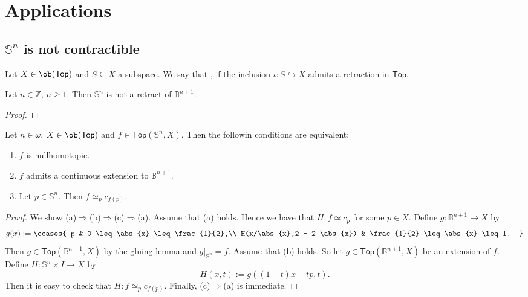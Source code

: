 \section*{Applications}
\subsection*{$\mathbb{S}^n$ is not contractible}

\begin{definition}[Retract]
	Let $X \in \ob(\mathsf{Top})$ and $S \subseteq X$ a subspace. We say that ,  if the inclusion $\iota : S \hookrightarrow X$ admits a retraction in $\mathsf{Top}$.
\end{definition}

\begin{lemma}
	Let $n \in \mathbb{Z}$, $n \geq 1$. Then $\mathbb{S}^n$ is not a retract of $\mathbb{B}^{n + 1}$. 	
\end{lemma}

\begin{proof}
	
\end{proof}

\begin{proposition}
	Let $n \in \omega$, $X \in \ob(\mathsf{Top})$ and $f \in \mathsf{Top}(\mathbb{S}^n,X)$. Then the followin conditions are equivalent:
	\begin{enumerate}[label = \textup{(}\alph*\textup{)},wide = 0pt]
		\item $f$ is nullhomotopic.
		\item $f$ admits a continuous extension to $\mathbb{B}^{n+1}$.
		\item Let $p \in \mathbb{S}^n$. Then $f \simeq_p c_{f(p)}$.
	\end{enumerate}
\end{proposition}

\begin{proof}
	We show (a)$\Rightarrow$(b)$\Rightarrow$(c)$\Rightarrow$(a). Assume that (a) holds. Hence we have that $H : f \simeq c_p$ for some $p \in X$. Define $g : \mathbb{B}^{n+1} \to X$ by
	\begin{equation*}
		g(x) := \ccases{
			p & 0 \leq \abs{x} \leq \frac{1}{2},\\
			H(x/\abs{x},2 - 2 \abs{x}) & \frac{1}{2} \leq \abs{x} \leq 1.
		}
	\end{equation*}
	Then $g \in \mathsf{Top}(\mathbb{B}^{n+1},X)$ by the gluing lemma and $g\vert_{\mathbb{S}^n} = f$. Assume that (b) holds. So let $g \in \mathsf{Top}(\mathbb{B}^{n+1},X)$ be an extension of $f$. Define $H : \mathbb{S}^n \times I \to X$ by
	\begin{equation*}
		H(x,t) := g((1 - t)x + tp,t).
	\end{equation*}
	Then it is easy to check that $H : f \simeq_p c_{f(p)}$. Finally, (c)$\Rightarrow$(a) is immediate.
\end{proof}


